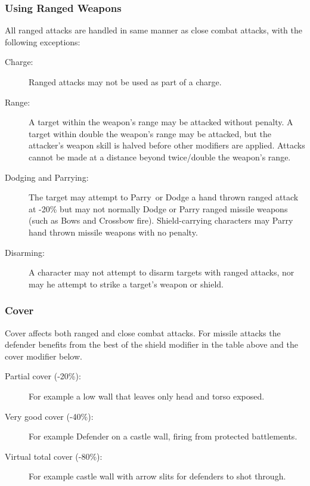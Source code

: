 \subsubsection{Using Ranged Weapons}
All ranged attacks are handled in same manner as close combat attacks, with the following exceptions: 
\begin{description}
\item[Charge:] Ranged attacks may not be used as part of a charge.
\item[Range:] A target within the weapon’s range may be attacked without penalty. A target within double the weapon’s range may be attacked, but the attacker’s weapon skill is halved before other modifiers are applied. Attacks cannot be made at a distance beyond twice/double the weapon’s range.
\item[Dodging and Parrying:] The target may attempt to Parry or Dodge a hand thrown ranged attack at -20\% but may not normally Dodge or Parry ranged missile weapons (such as Bows and Crossbow fire). Shield-carrying characters may Parry hand thrown missile weapons with no penalty.
\item[Disarming:] A character may not attempt to disarm targets with ranged attacks, nor may he attempt to strike a target’s weapon or shield.
\end{description}

\subsubsection{Cover}
Cover affects both ranged and close combat attacks. For missile attacks the defender benefits from the best of the shield modifier in the table above and the cover modifier below.

\begin{description}
	\item[Partial cover (-20\%):] For example a low wall that leaves only head and torso exposed.
	\item[Very good cover (-40\%):] For example Defender on a castle wall, firing from protected battlements.
	\item[Virtual total cover (-80\%):] For example castle wall with arrow slits for defenders to shot through.
\end{description}


